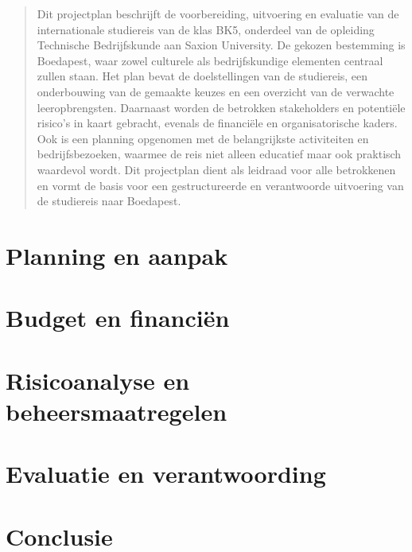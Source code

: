 \documentclass{BK5}
\author{Stijn van Straten {\small (493809)}\\
	Marijn van der Gracht {\small (499194)}\\
	Tristan van Duuren {\small (480101)}\\
	Florent Kegler {\small (514277)}
}
\date{\today}
\begin{document}
	\maketitle
	
	
	
	\newpage
	
	\begin{abstract}
		Dit projectplan beschrijft de voorbereiding, uitvoering en evaluatie van de internationale studiereis van de klas BK5, onderdeel van de opleiding Technische Bedrijfskunde aan Saxion University. De gekozen bestemming is Boedapest, waar zowel culturele als bedrijfskundige elementen centraal zullen staan. Het plan bevat de doelstellingen van de studiereis, een onderbouwing van de gemaakte keuzes en een overzicht van de verwachte leeropbrengsten. Daarnaast worden de betrokken stakeholders en potentiële risico’s in kaart gebracht, evenals de financiële en organisatorische kaders. Ook is een planning opgenomen met de belangrijkste activiteiten en bedrijfsbezoeken, waarmee de reis niet alleen educatief maar ook praktisch waardevol wordt. Dit projectplan dient als leidraad voor alle betrokkenen en vormt de basis voor een gestructureerde en verantwoorde uitvoering van de studiereis naar Boedapest.
	\end{abstract}
	
	\tableofcontents
	
	\newpage
	
	
	
	\newpage
	
	
	
	
	
	
	
	
	
	\section{Planning en aanpak}
	
	\section{Budget en financiën}
	
	\section{Risicoanalyse en beheersmaatregelen}
	
	\section{Evaluatie en verantwoording}
	
	\section{Conclusie}
	
\end{document}
